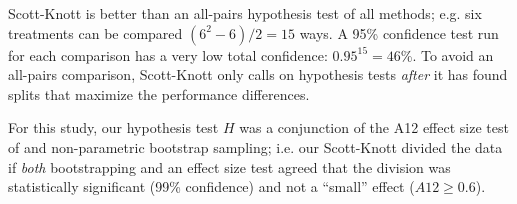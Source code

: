 \documentclass[conference]{IEEEtran}
\newcommand{\rowstyle}[1]{\gdef\currentrowstyle{#1}%
  #1\ignorespaces
}
\begin{document}
	Scott-Knott is better than an 
	all-pairs hypothesis test of all methods; e.g. six treatments
	can be compared \mbox{$(6^2-6)/2=15$} ways. 
	A 95\% confidence test run for each comparison has  a very low total confidence: 
	\mbox{$0.95^{15} = 46$}\%.
	To avoid an all-pairs comparison, Scott-Knott only calls on hypothesis
	tests {\em after} it has found splits that maximize the performance differences.
	
	For this study, our hypothesis test $H$ was a
	conjunction of the A12 effect size test of  and
	non-parametric bootstrap sampling; i.e. our
	Scott-Knott divided the data if {\em both}
	bootstrapping and an effect size test agreed that
	the division was statistically significant (99\%
	confidence) and not a ``small'' effect ($A12 \ge
	0.6$).
	
	\begin{table}[htbp]
    \begin{minipage}{0.98\linewidth}
        \centering
        \caption{Runtimes of GALE and DE in seconds}
        \label{tab:runtimes}
    \end{minipage}
    \end{table}
	
\end{document}
